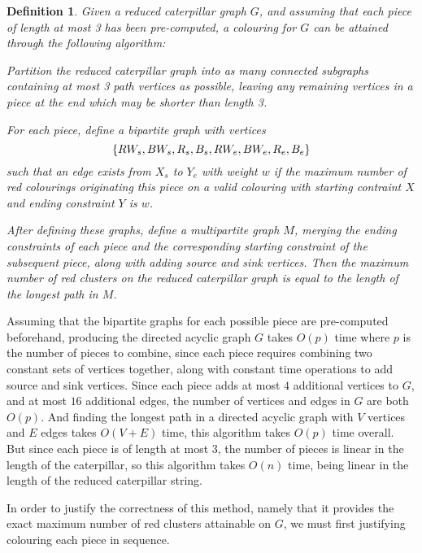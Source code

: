 \documentclass{mpaper}
\newtheorem{definition}{Definition}[section]
\begin{document}
\begin{definition}
\label{def/caterpillar-algorithm}
  Given a reduced caterpillar graph $G$, and assuming that each piece of length at most 3 has been pre-computed, a colouring for $G$ can be attained through the following algorithm:

  Partition the reduced caterpillar graph into as many connected subgraphs containing at most 3 path vertices as possible, leaving any remaining vertices in a piece at the end which may be shorter than length 3.

  For each piece, define a bipartite graph with vertices $$\{RW_{s}, BW_{s}, R_{s}, B_{s}, \\ RW_{e}, BW_{e}, R_{e}, B_{e}\}$$ such that an edge exists from $X_{s}$ to $Y_{e}$ with weight $w$ if the maximum number of red colourings originating this piece on a valid colouring with starting contraint $X$ and ending constraint $Y$ is $w$.

  After defining these graphs, define a multipartite graph $M$, merging the ending constraints of each piece and the corresponding starting constraint of the subsequent piece, along with adding source and sink vertices. Then the maximum number of red clusters on the reduced caterpillar graph is equal to the length of the longest path in $M$.
\end{definition}


Assuming that the bipartite graphs for each possible piece are pre-computed beforehand, producing the directed acyclic graph $G$ takes $O(p)$ time where $p$ is the number of pieces to combine, since each piece requires combining two constant sets of vertices together, along with constant time operations to add source and sink vertices. Since each piece adds at most $4$ additional vertices to $G$, and at most $16$ additional edges, the number of vertices and edges in $G$ are both $O(p)$. And finding the longest path in a directed acyclic graph with $V$ vertices and $E$ edges takes $O(V+E)$ time, this algorithm takes $O(p)$ time overall. But since each piece is of length at most 3, the number of pieces is linear in the length of the caterpillar, so this algorithm takes $O(n)$ time, being linear in the length of the reduced caterpillar string.


In order to justify the correctness of this method, namely that it provides the exact maximum number of red clusters attainable on $G$, we must first justifying colouring each piece in sequence.
\end{document}
